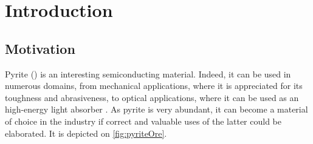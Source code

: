 \documentclass[11pt,a4paper]{article}
\makeatletter
\newcommand{\authors}{%
  \setlength\arrayrulewidth{2pt}
  \begin{tabular}{l|l}
  \@authorsi
}
\newcommand\@authorsi{\@ifnextchar\stopauthors{\@authorsend}{\@authorsii}}
\newcommand\@authorsii[2]{%
  \\
  \textbf{\Large #1} &  \textbf{\Large #2}
  \\
  \@authorsi %
}
\newcommand\@authorsend[1]{
  \end{tabular}}
\def \classSigle{LMAPR2451}
\def \className{Atomistic and nanoscopic simulations}
\def \workName{Study of \ch{FeS2} and its optical properties}
\def \professors{Professors Jean-Christophe Charlier, Xavier Gonze \& Gian-Marco Rignanese\\Mentors : Alexandre Cloots \& Ionel-Bogdan Guster}
\def \academicYear{2020-2021}
\def \abstractText{This report aims to investigate the optical properties of \ch{FeS2}. To do so, \textit{ab initio} computations are performed on a 6-atoms orthorhombic unit cell. The convergence with respect to several structural parameters is also studied. The optical properties are then analyzed in the light of the obtained results. Finally, a comparison is made with the published research, and a discussion about the quality of the simulation is made.}
\makeatother
\begin{document}
\tableofcontents
\newpage
\section{Introduction}
\subsection{Motivation}
Pyrite () is an interesting semiconducting material. Indeed, it can be used in numerous domains, from mechanical applications, where it is appreciated for its toughness and abrasiveness, to optical applications, where it can be used as an high-energy light absorber \cite{pyriteApps}. As pyrite is very abundant, it can become a material of choice in the industry if correct and valuable uses of the latter could be elaborated. It is depicted on \autoref{fig:pyriteOre}.
\end{document}
